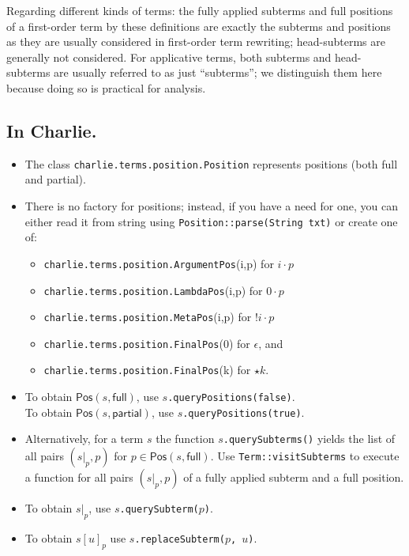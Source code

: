 \documentclass{lmcs}
\theoremstyle{theorem}\newtheorem{theorem}{Theorem}
\theoremstyle{theorem}\newtheorem{lemma}[theorem]{Lemma}
\theoremstyle{theorem}\newtheorem{corollary}[theorem]{Corollary}
\theoremstyle{definition}\newtheorem{definition}[theorem]{Definition}
\theoremstyle{definition}\newtheorem{example}[theorem]{Example}
\newcommand{\Positions}{\mathsf{Pos}}
\begin{document}
Regarding different kinds of terms: the fully applied subterms and full
positions of a first-order term by these definitions are exactly the subterms
and positions as they are usually considered in first-order term rewriting;
head-subterms are generally not considered.  For applicative terms, both
subterms and head-subterms are usually referred to as just ``subterms''; we
distinguish them here because doing so is practical for analysis.

\subsection*{In Charlie.}

\begin{itemize}
\item The class \texttt{charlie.terms.position.Position} represents positions
  (both full and partial).
\item There is no factory for positions; instead, if you have a need for one,
  you can either read it from string using \texttt{Position::parse(String txt)}
  or create one of:
  \begin{itemize}
  \item \texttt{charlie.terms.position.ArgumentPos}(i,p) for $i \cdot p$
  \item \texttt{charlie.terms.position.LambdaPos}(i,p) for $0 \cdot p$
  \item \texttt{charlie.terms.position.MetaPos}(i,p) for $!i \cdot p$
  \item \texttt{charlie.terms.position.FinalPos}(0) for $\epsilon$, and
  \item \texttt{charlie.terms.position.FinalPos}(k) for $\star k$.
  \end{itemize}
\item To obtain $\Positions(s,\mathsf{full})$, use
  \texttt{$s$.queryPositions(false)}. \\
  To obtain $\Positions(s,\mathsf{partial})$, use
  \texttt{$s$.queryPositions(true)}.
\item Alternatively, for a term $s$ the function
  \texttt{$s$.querySubterms()} yields the list of all pairs $(s|_p,p)$ for
  $p \in \Positions(s,\mathsf{full})$.  Use \texttt{Term::visitSubterms} to
  execute a function for all pairs $(s|_p,p)$ of a fully applied subterm and a
  full position.
\item To obtain $s|_p$, use \texttt{$s$.querySubterm($p$)}.
\item To obtain $s[u]_p$ use \texttt{$s$.replaceSubterm($p$, $u$)}.
\end{itemize}
\end{document}

